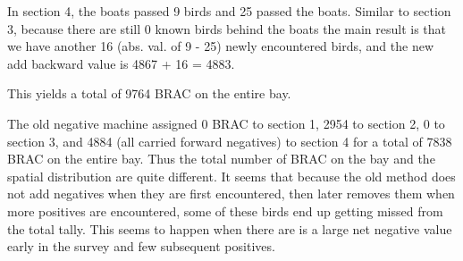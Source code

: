 \documentclass[
]{article}
\begin{document}
In section 4, the boats passed 9 birds and 25 passed the boats. Similar
to section 3, because there are still 0 known birds behind the boats the
main result is that we have another 16 (abs. val. of 9 - 25) newly
encountered birds, and the new add backward value is 4867 + 16 = 4883.

This yields a total of 9764 BRAC on the entire bay.

The old negative machine assigned 0 BRAC to section 1, 2954 to section
2, 0 to section 3, and 4884 (all carried forward negatives) to section 4
for a total of 7838 BRAC on the entire bay. Thus the total number of
BRAC on the bay and the spatial distribution are quite different. It
seems that because the old method does not add negatives when they are
first encountered, then later removes them when more positives are
encountered, some of these birds end up getting missed from the total
tally. This seems to happen when there are is a large net negative value
early in the survey and few subsequent positives.

\newpage  

\providecommand{\docline}[3]{\noalign{\global\setlength{\arrayrulewidth}{#1}}\arrayrulecolor[HTML]{#2}\cline{#3}}

\setlength{\tabcolsep}{2pt}

\renewcommand*{\arraystretch}{1.5}
\end{document}
